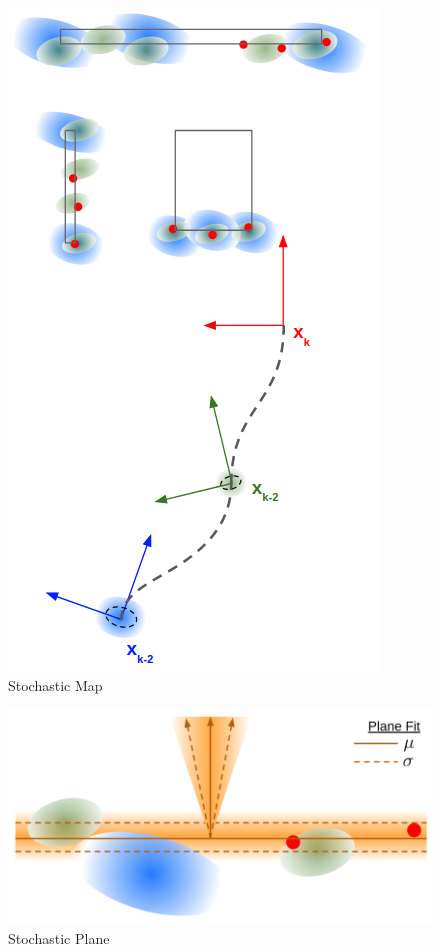 \documentclass[letterpaper, 10 pt, conference]{ieeeconf}  %
\begin{document}
\begin{figure}[t!]
    \centering
    \includegraphics[width=0.65\linewidth]{figs/StochasticMap.png}
    \caption{Stochastic Map}
    \label{fig:s_map}
\end{figure}

\begin{figure}[h!]
    \centering
    \includegraphics[width=0.95\linewidth]{figs/StochasticPlane.png}
    \caption{Stochastic Plane}
    \label{fig:s_cone}
\end{figure}
\end{document}

